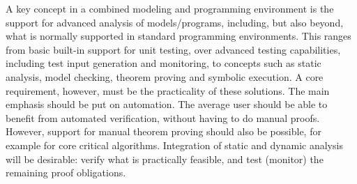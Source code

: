 A key concept in a combined modeling and programming environment is 
the support for advanced analysis of models/programs, including, 
but also beyond, what is normally supported in standard programming 
environments. This ranges from basic built-in support for unit 
testing, over advanced testing capabilities, including test input 
generation and monitoring, to concepts such as static analysis, 
model checking, theorem proving and symbolic execution. A core 
requirement, however, must be the practicality of these solutions. 
The main emphasis should be put on automation. The average user 
should be able to benefit from automated verification, without 
having to do manual proofs. However, support for manual theorem 
proving should also be possible, for example for core critical 
algorithms. Integration of static and dynamic analysis will be 
desirable: verify what is practically feasible, and test (monitor) 
the remaining proof obligations.




